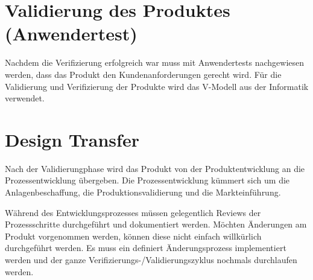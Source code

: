 \section{Validierung des Produktes (Anwendertest)}

Nachdem die Verifizierung erfolgreich war muss mit Anwendertests nachgewiesen werden, dass das Produkt den Kundenanforderungen gerecht wird. Für die Validierung und Verifizierung der Produkte wird das V-Modell aus der Informatik verwendet.

\section{Design Transfer}

Nach der Validierungphase wird das Produkt von der Produktentwicklung an die Prozessentwicklung übergeben. Die Prozessentwicklung kümmert sich um die Anlagenbeschaffung, die Produktionsvalidierung und die Markteinführung. 

Während des Entwicklungsprozesses müssen gelegentlich Reviews der Prozessschritte durchgeführt und dokumentiert werden. Möchten Änderungen am Produkt vorgenommen werden, können diese nicht einfach willkürlich durchgeführt werden. Es muss ein definiert Änderungsprozess implementiert werden und der ganze Verifizierungs-/Validierungszyklus nochmals durchlaufen werden.